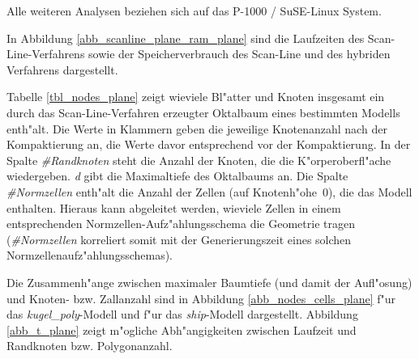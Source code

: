 Alle weiteren Analysen beziehen sich auf das P-1000 / SuSE-Linux System.

In Abbildung \ref{abb_scanline_plane_ram_plane} sind die Laufzeiten 
des Scan-Line-Verfahrens sowie der Speicherverbrauch des Scan-Line und 
des hybriden Verfahrens dargestellt. 


Tabelle \ref{tbl_nodes_plane} zeigt wieviele Bl"atter und 
Knoten insgesamt ein durch das Scan-Line-Verfahren erzeugter 
Oktalbaum eines bestimmten Modells enth"alt. 
Die Werte in Klammern geben die jeweilige Knotenanzahl nach der Kompaktierung 
an, die Werte davor entsprechend vor der Kompaktierung. In der Spalte 
\emph{\#Randknoten} steht die Anzahl der Knoten, die die K"orperoberfl"ache 
wiedergeben. 
\emph{d} gibt die Maximaltiefe des Oktalbaums an. 
Die Spalte \emph{\#Normzellen} enth"alt die Anzahl der Zellen 
(auf Knotenh"ohe~$0$), 
die das Modell enthalten. Hieraus kann abgeleitet werden, wieviele Zellen 
in einem entsprechenden Normzellen-Aufz"ahlungsschema die Geometrie tragen
(\emph{\#Normzellen} korreliert somit mit der Generierungszeit eines solchen 
Normzellenaufz"ahlungsschemas). 

Die Zusammenh"ange zwischen maximaler Baumtiefe (und damit der Aufl"osung) 
und Knoten- bzw. Zallanzahl sind in 
Abbildung \ref{abb_nodes_cells_plane} f"ur das 
\emph{kugel\_poly}-Modell und f"ur das \emph{ship}-Modell dargestellt. 
Abbildung \ref{abb_t_plane} zeigt m"ogliche Abh"angigkeiten zwischen 
Laufzeit und Randknoten bzw. Polygonanzahl. 


